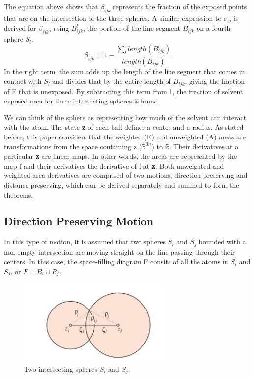 \documentclass{article}
\newcommand{\R}{\mathbb{R}}
\begin{document}
The equation above shows that $\beta_{ijk}$ represents the fraction of the exposed points that are on the intersection of the three spheres. A similar expression to $\sigma_{ij}$ is derived for $\beta_{ijk}$, using $B^l_{ijk}$, the portion of the line segment $B_{ijk}$ on a fourth sphere $S_l$. 
\begin{equation*}
\beta_{ijk} = 1 - \frac{\sum_{l}length(B^l_{ijk})}{length(B_{ijk})}
\end{equation*}
In the right term, the sum adds up the length of the line segment that comes in contact with $S_l$ and divides that by the entire length of $B_{ijk}$, giving the fraction of F that is unexposed. By subtracting this term from 1, the fraction of solvent exposed area for three intersecting spheres is found.

We can think of the sphere as representing how much of the solvent can interact with the atom. The state \textbf{z} of each ball defines a center and a radius. As stated before, this paper considers that the weighted (E) and unweighted (A) areas are transformations from the space containing z ($\R^{3n}$) to $\R$. Their derivatives at a particular \textbf{z} are linear maps. In other words, the areas are represented by the map f and their derivatives the derivative of f at \textbf{z}. Both unweighted and weighted area derivatives are comprised of two motions, direction preserving and distance preserving, which can be derived separately and summed to form the theorems.
 
\subsection{Direction Preserving Motion} 
In this type of motion, it is assumed that two spheres $S_i$ and $S_j$ bounded with a non-empty intersection are moving straight on the line passing through their centers.
In this case, the space-filling diagram F consits of all the atoms in $S_i$ and $S_j$, or $F = B_i \cup B_j$.

\begin{figure}[h!]
\caption{Two intersecting spheres $S_i$ and $S_j$.}
\centerline{\includegraphics[width=3in]{Figure6}}
\end{figure}
\end{document}
